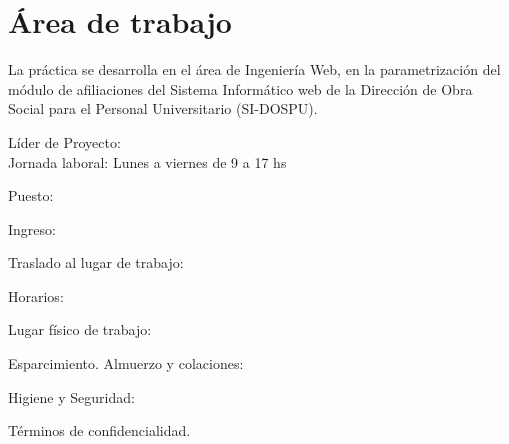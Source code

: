 \section{Área de trabajo}
La práctica se desarrolla en el área de Ingeniería Web, en la parametrización del módulo de afiliaciones del Sistema Informático web de la Dirección de Obra Social para el Personal Universitario (SI-DOSPU).

Líder de Proyecto: \\ %

Jornada laboral: Lunes a viernes de 9 a 17 hs

Puesto: %

Ingreso: %

Traslado al lugar de trabajo: %

Horarios: %

Lugar físico de trabajo: %


Esparcimiento. Almuerzo y colaciones: %

Higiene y Seguridad: %

Términos de confidencialidad. %


